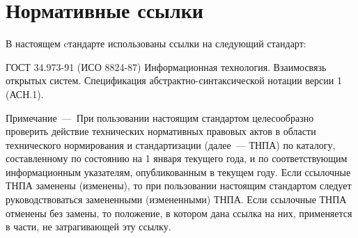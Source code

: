 \chapter{Нормативные ссылки}

В настоящем cтандарте использованы ссылки на следующий стандарт:

ГОСТ 34.973-91 (ИСО 8824-87) Информационная технология. Взаимосвязь
открытых систем. Спецификация абстрактно-синтаксической нотации
версии 1 (АСН.1).

\begin{note}
Примечание~---~При пользовании настоящим стандартом целесообразно проверить
действие технических нормативных правовых актов в области технического
нормирования и стандартизации (далее~--- ТНПА) по каталогу, составленному по
состоянию на 1 января текущего года, и по соответствующим информационным
указателям, опубликованным в текущем году.
%
Если ссылочные ТНПА заменены (изменены), то при пользовании настоящим стандартом
следует руководствоваться замененными (измененными) ТНПА. Если ссылочные ТНПА
отменены без замены, то положение, в котором дана ссылка на них, применяется в
части, не затрагивающей эту ссылку.
\end{note}

